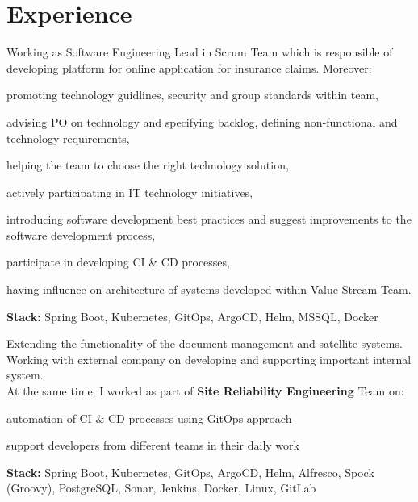 \section{Experience}

Working as Software Engineering Lead in Scrum Team which is responsible of developing platform for online application for insurance claims.
Moreover:
\vspace{\topsep} %
\begin{tightemize}
  \item promoting technology guidlines, security and group standards within team,
  \item advising PO on technology and specifying backlog, defining non-functional and technology requirements,
  \item helping the team to choose the right technology solution,
  \item actively participating in IT technology initiatives,
  \item introducing software development best practices and suggest improvements to the software development process,
  \item participate in developing CI \& CD processes,
  \item having influence on architecture of systems developed within Value Stream Team.
  \end{tightemize}
\textbf{Stack:} Spring Boot, Kubernetes, GitOps, ArgoCD, Helm, MSSQL, Docker
\sectionsep

Extending the functionality of the document management and satellite systems. 
Working with external company on developing and supporting important internal system. \\
At the same time, I worked as part of \textbf{Site Reliability Engineering} Team on:
\begin{tightemize}
\item automation of CI \& CD processes using GitOps approach
\item support developers from different teams in their daily work
\end{tightemize}
\textbf{Stack:} Spring Boot, Kubernetes, GitOps, ArgoCD, Helm, Alfresco, Spock (Groovy), PostgreSQL, Sonar, Jenkins, Docker, Linux, GitLab
\sectionsep


